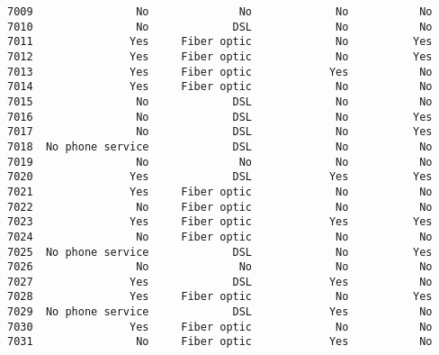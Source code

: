 \documentclass[11pt]{article}
\begin{document}
\begin{tcolorbox}[breakable, boxrule=.5pt, size=fbox, pad at break*=1mm, opacityfill=0]
\begin{Verbatim}[commandchars=\\\{\}]
7009                No              No             No           No
7010                No             DSL             No           No
7011               Yes     Fiber optic             No          Yes
7012               Yes     Fiber optic             No          Yes
7013               Yes     Fiber optic            Yes           No
7014               Yes     Fiber optic             No           No
7015                No             DSL             No           No
7016                No             DSL             No          Yes
7017                No             DSL             No          Yes
7018  No phone service             DSL             No           No
7019                No              No             No           No
7020               Yes             DSL            Yes          Yes
7021               Yes     Fiber optic             No           No
7022                No     Fiber optic             No           No
7023               Yes     Fiber optic            Yes          Yes
7024                No     Fiber optic             No           No
7025  No phone service             DSL             No          Yes
7026                No              No             No           No
7027               Yes             DSL            Yes           No
7028               Yes     Fiber optic             No          Yes
7029  No phone service             DSL            Yes           No
7030               Yes     Fiber optic             No           No
7031                No     Fiber optic            Yes           No


\end{Verbatim}
\end{tcolorbox}
\end{document}
